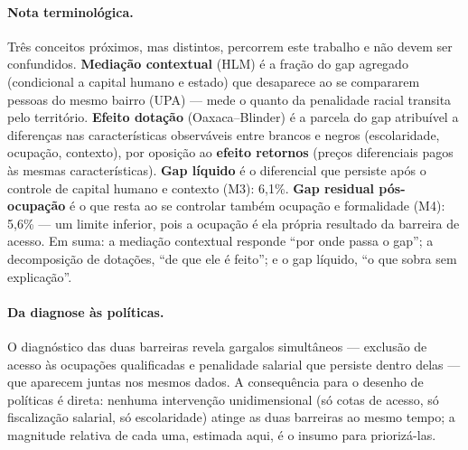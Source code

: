 \documentclass[11pt, a4paper, oneside]{article}
\begin{document}
\paragraph{Nota terminológica.}
Três conceitos próximos, mas distintos, percorrem este trabalho e não devem ser
confundidos. \textbf{Mediação contextual} (HLM) é a fração do gap agregado
(condicional a capital humano e estado) que {desaparece} ao se compararem
pessoas do mesmo bairro (UPA) --- mede o quanto da penalidade racial transita
{pelo} território.
\textbf{Efeito dotação} (Oaxaca--Blinder) é a parcela do gap atribuível a
{diferenças nas características observáveis} entre brancos e negros
(escolaridade, ocupação, contexto), por oposição ao \textbf{efeito retornos}
(preços diferenciais pagos às mesmas características).
\textbf{Gap líquido} é o diferencial que {persiste} após o controle de
capital humano e contexto (M3): 6,1\%. \textbf{Gap residual pós-ocupação} é o
que resta ao se controlar também ocupação e formalidade (M4): 5,6\% --- um limite
inferior, pois a ocupação é ela própria resultado da barreira de acesso. Em suma: a mediação contextual responde
``por onde passa o gap''; a decomposição de dotações, ``de que ele é feito''; e o
gap líquido, ``o que sobra sem explicação''.

\paragraph{Da diagnose às políticas.}
O diagnóstico das duas barreiras revela gargalos simultâneos --- exclusão de
acesso às ocupações qualificadas e penalidade salarial que persiste dentro delas
--- que aparecem juntas nos mesmos dados. A consequência para o desenho de políticas
é direta: nenhuma intervenção unidimensional (só cotas de acesso, só fiscalização
salarial, só escolaridade) atinge as duas barreiras ao mesmo tempo; a magnitude
relativa de cada uma, estimada aqui, é o insumo para priorizá-las.
\end{document}
